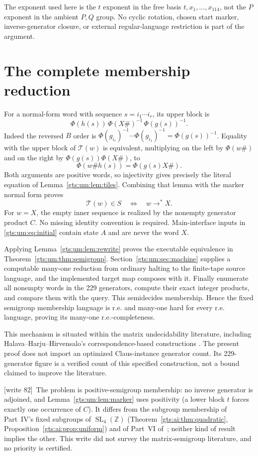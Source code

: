 \documentclass[11pt,letterpaper]{article}
\theoremstyle{definition}
\theoremstyle{remark}
\newcommand{\Z}{\mathbb Z}
\newcommand{\SL}{\operatorname{SL}}
\newcommand{\st}{\mathrel{\longrightarrow^{*}}}
\newcommand{\wtagc}{\textup{[write 82]}}
\begin{document}
The exponent used here is the $t$ exponent in the free basis $t,x_1,\ldots,x_{114}$, not the $P$ exponent in the ambient $P,Q$ group. No cyclic rotation, chosen start marker, inverse-generator closure, or external regular-language restriction is part of the argument.

\section{The complete membership reduction}
\label{gts:um:sec:reduction}
For a normal-form word with sequence $s=i_1\cdots i_r$, its upper block is
\[
 \Phi(h(s))\,\Phi(X\#)^{-1}\,\Phi(g(s))^{-1}.
\]
Indeed the reversed $B$ order is
$\Phi(g_{i_r})^{-1}\cdots\Phi(g_{i_1})^{-1}
=\Phi(g(s))^{-1}$. Equality with the upper block of $\mathcal T(w)$ is equivalent, multiplying on the left by $\Phi(w\#)$ and on the right by $\Phi(g(s))\Phi(X\#)$, to
\[
 \Phi(w\#h(s))=\Phi(g(s)X\#).
\]
Both arguments are positive words, so injectivity gives precisely the literal equation of Lemma~\ref{gts:um:lem:tiles}. Combining that lemma with the marker normal form proves
\[
 \mathcal T(w)\in S\quad\Longleftrightarrow\quad w\st X.
\]
For $w=X$, the empty inner sequence is realized by the nonempty generator product $C$. No missing identity convention is required. Main-interface inputs in \eqref{gts:um:eq:initial} contain state $A$ and are never the word $X$.

Applying Lemma~\ref{gts:um:lem:rewrite} proves the executable equivalence in Theorem~\ref{gts:um:thm:semigroup}. Section~\ref{gts:um:sec:machine} supplies a computable many-one reduction from ordinary halting to the finite-tape source language, and the implemented target map composes with it. Finally enumerate all nonempty words in the 229 generators, compute their exact integer products, and compare them with the query. This semidecides membership. Hence the fixed semigroup membership language is r.e. and many-one hard for every r.e. language, proving its many-one r.e.-completeness.

This mechanism is situated within the matrix undecidability literature, including Halava--Harju--Hirvensalo's correspondence-based constructions \cite{um-HHH}. The present proof does not import an optimized Claus-instance generator count. Its 229-generator figure is a verified count of this specified construction, not a bound claimed to improve the literature.

\wtagc\ The problem is positive-semigroup membership: no inverse generator is adjoined, and Lemma~\ref{gts:um:lem:marker} uses positivity (a lower block $t$ forces exactly one occurrence of $C$). It differs from the subgroup membership of Part~IV's fixed subgroups of $\SL_4(\Z)$ (Theorem~\ref{gts:ai:thm:quadratic}, Proposition~\ref{gts:ai:prop:uniform}) and of Part~VI of~\cite{pqc}; neither kind of result implies the other. This write did not survey the matrix-semigroup literature, and no priority is certified.
\end{document}

